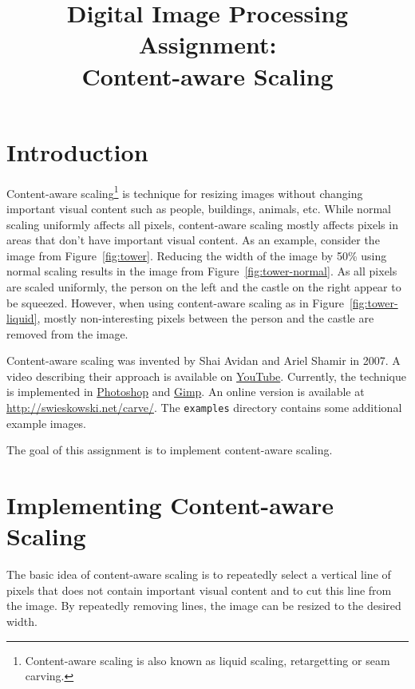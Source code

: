 \documentclass{article}
\title{Digital Image Processing Assignment:\\Content-aware Scaling}
\begin{document}
\maketitle

\section{Introduction}
Content-aware scaling\footnote{Content-aware scaling is also known as liquid scaling, retargetting or seam carving.} is technique for resizing images without changing important visual content such as people, buildings, animals, etc. While normal scaling uniformly affects all pixels, content-aware scaling mostly affects pixels in areas that don't have important visual content. As an example, consider the image from Figure~\ref{fig:tower}. Reducing the width of the image by 50\% using normal scaling results in the image from Figure~\ref{fig:tower-normal}. As all pixels are scaled uniformly, the person on the left and the castle on the right appear to be squeezed. However, when using content-aware scaling as in Figure~\ref{fig:tower-liquid}, mostly non-interesting pixels between the person and the castle are removed from the image.

\begin{figure}[h]
\begin{center}
\end{center}
\end{figure}

Content-aware scaling was invented by Shai Avidan and Ariel Shamir in 2007. A video describing their approach is available on \href{http://www.youtube.com/watch?v=6NcIJXTlugc}{YouTube}. Currently, the technique is implemented in \href{http://help.adobe.com/en\_US/Photoshop/11.0/WS6F81C45F-2AC0-4685-8FFD-DBA374BF21CD.html}{Photoshop} and \href{http://liquidrescale.wikidot.com/}{Gimp}. An online version is available at \href{http://swieskowski.net/carve/}{http://swieskowski.net/carve/}. The \texttt{examples} directory contains some additional example images.

The goal of this assignment is to implement content-aware scaling.

\section{Implementing Content-aware Scaling}\label{sec:implementing}
The basic idea of content-aware scaling is to repeatedly select a vertical line of pixels that does not contain important visual content and to cut this line from the image. By repeatedly removing lines, the image can be resized to the desired width.
\end{document}
